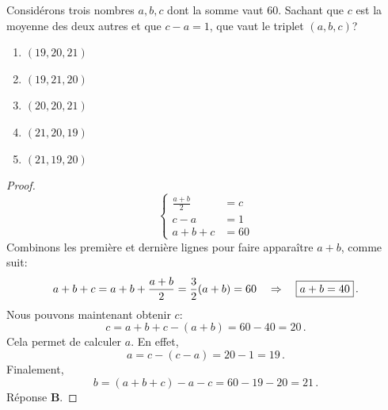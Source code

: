 % 
%
\label{1.8}%
Considérons trois nombres $a, b, c$ dont la somme vaut $60$. Sachant que $c$ est la moyenne des deux autres et que %
$c - a = 1$, que vaut le triplet $(a, b, c)$?
\begin{enumerate}
  \item $(19,20,21)$
  \item $(19,21,20)$
  \item $(20,20,21)$
  \item $(21,20,19)$
  \item $(21,19,20)$
\end{enumerate}
%
\begin{proof}
%
\begin{equation}
  \begin{cases}
    \frac{a+b}{2} &= c \\
    c - a &= 1 \\
    a + b + c &= 60
  \end{cases}
\end{equation}
%
Combinons les première et dernière lignes pour faire apparaître $a+b$, comme suit:
%
\begin{equation*}
  a + b + c = a + b + \frac{a+b}{2} =  \frac{3}{2}(a+b) = 60 \quad \Rightarrow \quad \boxed{a+b = 40} \,.
\end{equation*}
%
Nous pouvons maintenant obtenir $c$:
%
\begin{equation*}
  \boxed{c} = a + b + c - (a + b) = 60 - 40 = \boxed{20} \,.
\end{equation*}
%
Cela permet de calculer $a$. En effet, 
%
\begin{equation*}
  \boxed{a} = c - (c-a) = 20 - 1 = \boxed{19} \,. 
\end{equation*}
%
Finalement,
%
\begin{equation*}
  \boxed{b} = (a + b + c) - a - c  = 60 - 19 - 20 = \boxed{21} \,.
\end{equation*}
%
Réponse \textbf{B}.
\end{proof}